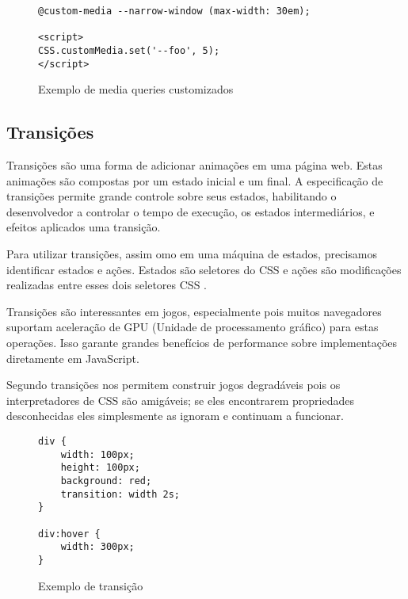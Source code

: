 \begin{figure}
\centering
\begin{verbatim}
@custom-media --narrow-window (max-width: 30em);

<script>
CSS.customMedia.set('--foo', 5);
</script>

\end{verbatim}
\caption{Exemplo de media queries customizados}
\label{fig:MediaQueryCustom}
\end{figure}


\subsection{Transições}

Transições são uma forma de adicionar animações em uma página
web. Estas animações são compostas por um estado inicial e um final.
A especificação de transições permite grande controle sobre seus
estados, habilitando o desenvolvedor a controlar o tempo de execução,
os estados intermediários, e efeitos aplicados uma transição.

Para utilizar transições, assim omo em uma máquina de estados,
precisamos identificar estados e ações. Estados são seletores do CSS
e ações são modificações realizadas entre esses dois seletores CSS
\autocite{html5mostwanted}.

Transições são interessantes em jogos, especialmente pois muitos
navegadores suportam aceleração de GPU (Unidade de processamento
gráfico) para estas operações. Isso garante grandes benefícios de
performance sobre implementações diretamente em JavaScript.

Segundo \cite{html5mostwanted} transições nos permitem construir jogos
degradáveis pois os interpretadores de CSS são amigáveis; se eles
encontrarem propriedades desconhecidas eles simplesmente as ignoram e
continuam a funcionar.

\begin{figure}
\centering
\begin{verbatim}
div {
    width: 100px;
    height: 100px;
    background: red;
    transition: width 2s;
}

div:hover {
    width: 300px;
}

\end{verbatim}
\caption{Exemplo de transição}
\label{fig:CSSTransition}
\end{figure}

